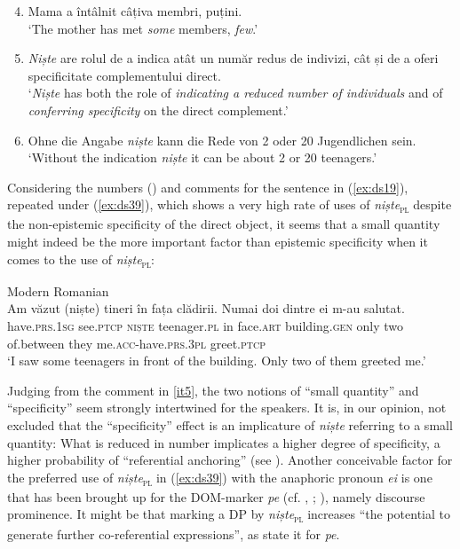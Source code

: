 \documentclass[output=paper,colorlinks,citecolor=brown]{langscibook}
\begin{document}
\begin{enumerate}\setcounter{enumi}{3}
    \item   Mama a întâlnit câțiva membri, puțini.\\
            ‘The mother has met \textit{some} members, \textit{few}.’\label{it4}
    \item   \textit{Niște} are rolul de a indica atât un num\u{a}r redus de indivizi, cât și de a oferi specificitate complementului direct.\\
            ‘\textit{Niște} has both the role of \textit{indicating a reduced number of individuals} and of \textit{conferring specificity} on the direct complement.’\label{it5}
    \item   Ohne die Angabe \textit{niște} kann die Rede von 2 oder 20 Jugendlichen sein.\\
            ‘Without the indication \textit{niște} it can be about 2 or 20 teenagers.’\label{it6}
\end{enumerate}

Considering the numbers () and comments for the sentence in (\ref{ex:ds19}), repeated under (\ref{ex:ds39}), which shows a very high rate of uses of \textit{niște}\textsubscript{\textsc{pl}} despite the non-epistemic specificity of the direct object, it seems that a small quantity might indeed be the more important factor than epistemic specificity when it comes to the use of \textit{niște}\textsubscript{\textsc{pl}}:

\ea\label{ex:ds39} Modern Romanian\\
\gll Am v\u{a}zut (niște) tineri în fața cl\u{a}dirii. Numai doi dintre ei m-au salutat.\\
have.\textsc{prs}.1\textsc{sg} see.\textsc{ptcp} \textsc{niște} teenager\textsc{.pl} in face.\textsc{art} building.\textsc{gen} only      two of.between they me.\textsc{acc}{}-have.\textsc{prs}.3\textsc{pl} greet.\textsc{ptcp}\\
\glt ‘I saw some teenagers in front of the building. Only two of them greeted me.’
\z

Judging from the comment in \ref{it5}, the two notions of “small quantity” and “specificity” seem strongly intertwined for the speakers. It is, in our opinion, not excluded that the “specificity” effect is an implicature of \textit{niște} referring to a small quantity: What is reduced in number implicates a higher degree of specificity, a higher probability of “referential anchoring” (see ). Another conceivable factor for the preferred use of \textit{niște}\textsubscript{\textsc{pl}} in (\ref{ex:ds39}) with the anaphoric pronoun \textit{ei} is one that has been brought up for the DOM-marker \textit{pe} (cf. \cite{ChiriacescuHeusinger2009}, \citeyear{ChiriacescuHeusinger2010}; \cite{HeusingerChiriacescu2013}), namely discourse prominence. It might be that marking a DP by \textit{niște}\textsubscript{\textsc{pl}} increases “the potential to generate further co-referential expressions”, as \citet[13]{ChiriacescuHeusinger2009} state it for \textit{pe}. 
\end{document}
